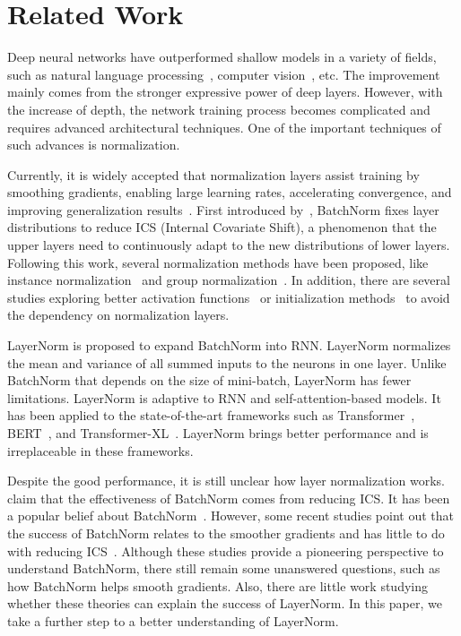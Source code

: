 \documentclass{article}
\begin{document}
\section{Related Work}

Deep neural networks have outperformed shallow models in a variety of fields, such as natural language processing~\citep{sutskever2014sequence,bahdanau2014neural, devlin2018bert}, computer vision~\citep{he2016deep,huang2017densely}, etc. The improvement mainly comes from the stronger expressive power of deep layers. However, with the increase of depth, the network training process becomes complicated and requires advanced architectural techniques. One of the important techniques of such advances is normalization.   


Currently, it is widely accepted that normalization layers assist training by smoothing gradients, enabling large learning rates, accelerating convergence, and improving generalization results~\citep{DBLP:journals/corr/abs-1901-09321}. 
First introduced by~\citet{ioffe2015batch}, BatchNorm fixes layer distributions to reduce ICS (Internal Covariate Shift), a phenomenon that the upper layers need to continuously adapt to the new distributions of lower layers.  
Following this work, several normalization methods have been proposed, like instance normalization~\citep{DBLP:journals/corr/UlyanovVL16} and group normalization~\citep{DBLP:conf/eccv/WuH18}. In addition, there are several studies exploring better activation functions~\citep{klambauer2017self} or initialization methods~\citep{DBLP:journals/corr/abs-1901-09321} to avoid the dependency on normalization layers. 


LayerNorm is proposed to expand BatchNorm into RNN. LayerNorm normalizes the mean and variance of all summed inputs to the neurons in one layer. Unlike BatchNorm that depends on the size of mini-batch, LayerNorm has fewer limitations. LayerNorm is adaptive to RNN and self-attention-based models. It has been applied to the state-of-the-art frameworks such as  Transformer~\citep{DBLP:conf/nips/VaswaniSPUJGKP17}, BERT~\citep{devlin2018bert}, and Transformer-XL~\citep{dai2019transformer}. LayerNorm brings better performance and is irreplaceable in these frameworks. 



Despite the good performance, it is still unclear how layer normalization works. 
~\citet{ioffe2015batch} claim that the effectiveness of BatchNorm comes from reducing ICS. 
It has been a popular belief about BatchNorm~\citep{santurkar2018does}. 
However, some recent studies point out that the success of BatchNorm relates to the smoother gradients and has little to do with reducing ICS~\citep{santurkar2018does,DBLP:conf/nips/BjorckGSW18}. Although these studies provide a pioneering perspective to understand BatchNorm, there still remain some unanswered questions, such as how BatchNorm helps smooth gradients. 
Also, there are little work studying whether these theories can explain the success of LayerNorm. In this paper, we take a further step to a better understanding of LayerNorm. 
\end{document}
